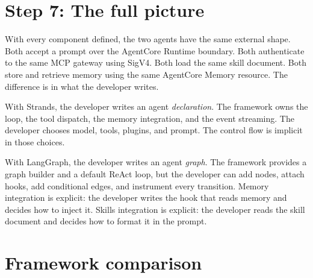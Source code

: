 \section{Step 7: The full picture}

With every component defined, the two agents have the same external shape. Both accept a
prompt over the AgentCore Runtime boundary. Both authenticate to the same MCP gateway
using SigV4. Both load the same skill document. Both store and retrieve memory using the
same AgentCore Memory resource. The difference is in what the developer writes.

With Strands, the developer writes an agent \emph{declaration}. The framework owns the
loop, the tool dispatch, the memory integration, and the event streaming. The developer
chooses model, tools, plugins, and prompt. The control flow is implicit in those choices.

With LangGraph, the developer writes an agent \emph{graph}. The framework provides a
graph builder and a default ReAct loop, but the developer can add nodes, attach hooks, add
conditional edges, and instrument every transition. Memory integration is explicit: the
developer writes the hook that reads memory and decides how to inject it. Skills
integration is explicit: the developer reads the skill document and decides how to format
it in the prompt.

\section{Framework comparison}

